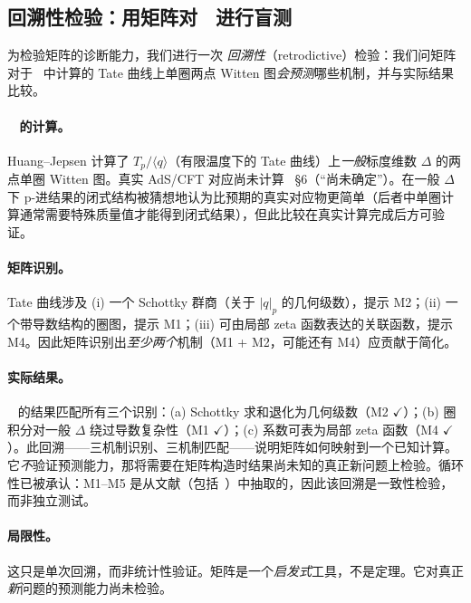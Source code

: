 \documentclass[11pt,a4paper]{ctexart}
\theoremstyle{remark}
\newcommand{\Tp}{T_p}
\newcommand{\normp}[1]{|#1|_p}
\begin{document}
\subsection{回溯性检验：用矩阵对~\cite{HJ24} 进行盲测}
\label{sec:retro}

为检验矩阵的诊断能力，我们进行一次 \emph{回溯性}（retrodictive）检验：我们问矩阵对于~\cite{HJ24} 中计算的 Tate 曲线上单圈两点 Witten 图\emph{会预测}哪些机制，并与实际结果比较。

\paragraph{~\cite{HJ24} 的计算。}
Huang--Jepsen 计算了 $\Tp/\langle q \rangle$（有限温度下的 Tate 曲线）上\emph{一般}标度维数 $\Delta$ 的两点单圈 Witten 图。真实 AdS/CFT 对应尚未计算~\cite{HJ24} \S6（``尚未确定''）。在一般 $\Delta$ 下 p-进结果的闭式结构被猜想地认为比预期的真实对应物更简单（后者中单圈计算通常需要特殊质量值才能得到闭式结果），但此比较在真实计算完成后方可验证。

\paragraph{矩阵识别。}
Tate 曲线涉及 (i) 一个 Schottky 群商（关于 $\normp{q}$ 的几何级数），提示 M2；(ii) 一个带导数结构的圈图，提示 M1；(iii) 可由局部 zeta 函数表达的关联函数，提示 M4。因此矩阵识别出\emph{至少两个}机制（M1 + M2，可能还有 M4）应贡献于简化。

\paragraph{实际结果。}
~\cite{HJ24} 的结果匹配所有三个识别：(a) Schottky 求和退化为几何级数（M2 $\checkmark$）；(b) 圈积分对一般 $\Delta$ 绕过导数复杂性（M1 $\checkmark$）；(c) 系数可表为局部 zeta 函数（M4 $\checkmark$）。此回溯——三机制识别、三机制匹配——说明矩阵如何映射到一个已知计算。它\emph{不}验证预测能力，那将需要在矩阵构造时结果尚未知的真正新问题上检验。循环性已被承认：M1--M5 是从文献（包括~\cite{HJ24}）中抽取的，因此该回溯是一致性检验，而非独立测试。

\paragraph{局限性。}
这只是单次回溯，而非统计性验证。矩阵是一个\emph{启发式}工具，不是定理。它对真正\emph{新}问题的预测能力尚未检验。

\end{document}
